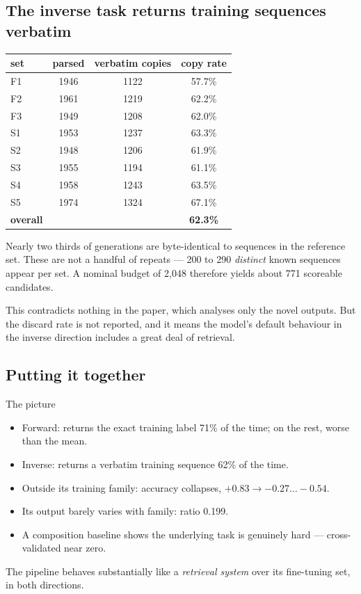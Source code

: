 \subsection{The inverse task returns training sequences verbatim}
\label{sec:regurgitation}

\begin{center}
\small
\begin{tabular}{lccc}
\toprule
\textbf{set} & \textbf{parsed} & \textbf{verbatim copies} & \textbf{copy rate} \\
\midrule
F1 & 1946 & 1122 & 57.7\% \\
F2 & 1961 & 1219 & 62.2\% \\
F3 & 1949 & 1208 & 62.0\% \\
S1 & 1953 & 1237 & 63.3\% \\
S2 & 1948 & 1206 & 61.9\% \\
S3 & 1955 & 1194 & 61.1\% \\
S4 & 1958 & 1243 & 63.5\% \\
S5 & 1974 & 1324 & 67.1\% \\
\midrule
\textbf{overall} & & & \textbf{62.3\%} \\
\bottomrule
\end{tabular}
\end{center}

Nearly two thirds of generations are byte-identical to sequences in the
reference set. These are not a handful of repeats --- 200 to 290 \emph{distinct}
known sequences appear per set. A nominal budget of 2{,}048 therefore yields
about 771 scoreable candidates.

This contradicts nothing in the paper, which analyses only the novel outputs.
But the discard rate is not reported, and it means the model's default
behaviour in the inverse direction includes a great deal of retrieval.

\subsection{Putting it together}

\begin{keybox}{The picture}
\begin{itemize}[leftmargin=*,itemsep=2pt]
  \item Forward: returns the exact training label 71\% of the time; on the rest,
        worse than the mean.
  \item Inverse: returns a verbatim training sequence 62\% of the time.
  \item Outside its training family: accuracy collapses, $+0.83 \to -0.27\ldots-0.54$.
  \item Its output barely varies with family: ratio 0.199.
  \item A composition baseline shows the underlying task is genuinely hard ---
        cross-validated \Rsq{} near zero.
\end{itemize}
The pipeline behaves substantially like a \emph{retrieval system} over its
fine-tuning set, in both directions.
\end{keybox}

